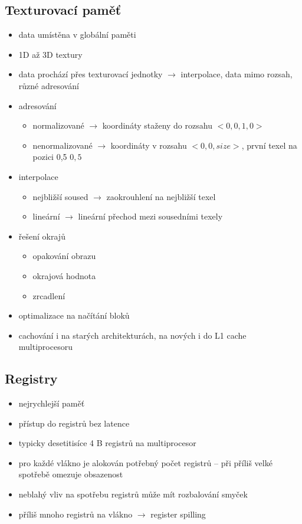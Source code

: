 	
	\subsection*{Texturovací paměť}
		\begin{itemize}
			\setlength\itemsep{0em}
			\item data umístěna v globální paměti
			\item 1D až 3D textury
			\item data prochází přes texturovací jednotky $\rightarrow$ interpolace, data mimo rozsah, různé adresování
			\item adresování
			\begin{itemize}
				\setlength\itemsep{0em}
				\item normalizované $\rightarrow$ koordináty staženy do rozsahu $<0{,}0, 1{,}0>$
				\item nenormalizované $\rightarrow$ koordináty v rozsahu $<0{,}0, size>$, první texel na pozici 0,5 $0{,}5$
			\end{itemize}
			\item interpolace
			\begin{itemize}
				\setlength\itemsep{0em}
				\item nejbližší soused $\rightarrow$ zaokrouhlení na nejbližší texel
				\item lineární $\rightarrow$ lineární přechod mezi sousedními texely
			\end{itemize}
			\item řešení okrajů
			\begin{itemize}
				\setlength\itemsep{0em}
				\item opakování obrazu
				\item okrajová hodnota
				\item zrcadlení
			\end{itemize}
			\item optimalizace na načítání bloků
			\item cachování i na starých architekturách, na nových i do L1 cache multiprocesoru
	\end{itemize}

	
	\subsection*{Registry}
	\begin{itemize}
		\setlength\itemsep{0em}
		\item nejrychlejší paměť
		\item přístup do registrů bez latence
		\item typicky desetitisíce 4 B registrů na multiprocesor
		\item pro každé vlákno je alokován potřebný počet registrů -- při příliš velké spotřebě omezuje obsazenost
		\item neblahý vliv na spotřebu registrů může mít rozbalování smyček
		\item příliš mnoho registrů na vlákno $\rightarrow$ register spilling
	\end{itemize}


